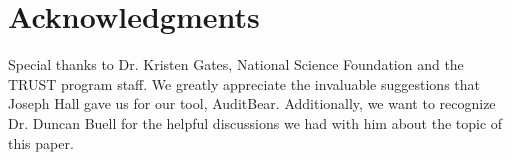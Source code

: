 \section{Acknowledgments}
Special thanks to Dr. Kristen Gates, National Science Foundation and the TRUST program staff.  We greatly appreciate the invaluable suggestions that Joseph Hall gave us for our tool, AuditBear.  Additionally, we want to recognize Dr. Duncan Buell for the helpful discussions we had with him about the topic of this paper.  
